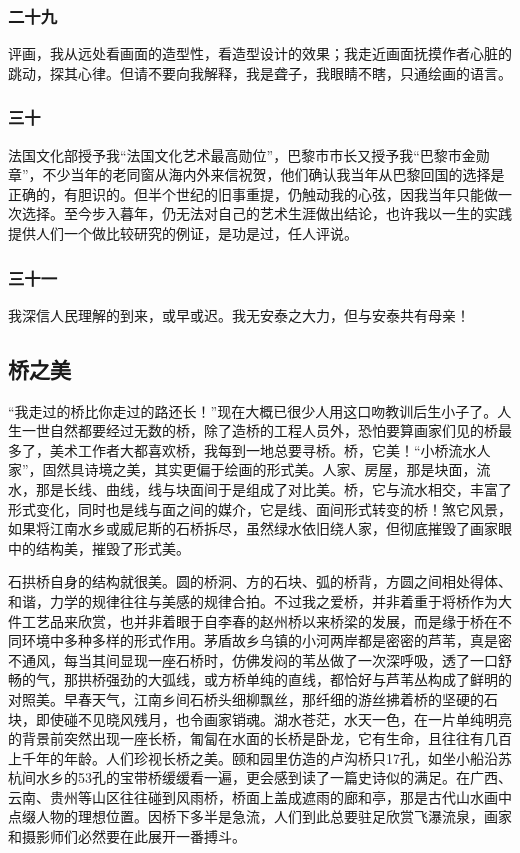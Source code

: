 \documentclass{article}
\begin{document}
\subsubsection{二十九}
评画，我从远处看画面的造型性，看造型设计的效果；我走近画面抚摸作者心脏的跳动，探其心律。但请不要向我解释，我是聋子，我眼睛不瞎，只通绘画的语言。
\subsubsection{三十}
法国文化部授予我“法国文化艺术最高勋位”，巴黎市市长又授予我“巴黎市金勋章”，不少当年的老同窗从海内外来信祝贺，他们确认我当年从巴黎回国的选择是正确的，有胆识的。但半个世纪的旧事重提，仍触动我的心弦，因我当年只能做一次选择。至今步入暮年，仍无法对自己的艺术生涯做出结论，也许我以一生的实践提供人们一个做比较研究的例证，是功是过，任人评说。
\subsubsection{三十一}
我深信人民理解的到来，或早或迟。我无安泰之大力，但与安泰共有母亲！
\subsection{桥之美}
“我走过的桥比你走过的路还长！”现在大概已很少人用这口吻教训后生小子了。人生一世自然都要经过无数的桥，除了造桥的工程人员外，恐怕要算画家们见的桥最多了，美术工作者大都喜欢桥，我每到一地总要寻桥。桥，它美！“小桥流水人家”，固然具诗境之美，其实更偏于绘画的形式美。人家、房屋，那是块面，流水，那是长线、曲线，线与块面间于是组成了对比美。桥，它与流水相交，丰富了形式变化，同时也是线与面之间的媒介，它是线、面间形式转变的桥！煞它风景，如果将江南水乡或威尼斯的石桥拆尽，虽然绿水依旧绕人家，但彻底摧毁了画家眼中的结构美，摧毁了形式美。

石拱桥自身的结构就很美。圆的桥洞、方的石块、弧的桥背，方圆之间相处得体、和谐，力学的规律往往与美感的规律合拍。不过我之爱桥，并非着重于将桥作为大件工艺品来欣赏，也并非着眼于自李春的赵州桥以来桥梁的发展，而是缘于桥在不同环境中多种多样的形式作用。茅盾故乡乌镇的小河两岸都是密密的芦苇，真是密不通风，每当其间显现一座石桥时，仿佛发闷的苇丛做了一次深呼吸，透了一口舒畅的气，那拱桥强劲的大弧线，或方桥单纯的直线，都恰好与芦苇丛构成了鲜明的对照美。早春天气，江南乡间石桥头细柳飘丝，那纤细的游丝拂着桥的坚硬的石块，即使碰不见晓风残月，也令画家销魂。湖水苍茫，水天一色，在一片单纯明亮的背景前突然出现一座长桥，匍匐在水面的长桥是卧龙，它有生命，且往往有几百上千年的年龄。人们珍视长桥之美。颐和园里仿造的卢沟桥只17孔，如坐小船沿苏杭间水乡的53孔的宝带桥缓缓看一遍，更会感到读了一篇史诗似的满足。在广西、云南、贵州等山区往往碰到风雨桥，桥面上盖成遮雨的廊和亭，那是古代山水画中点缀人物的理想位置。因桥下多半是急流，人们到此总要驻足欣赏飞瀑流泉，画家和摄影师们必然要在此展开一番搏斗。
\end{document}
